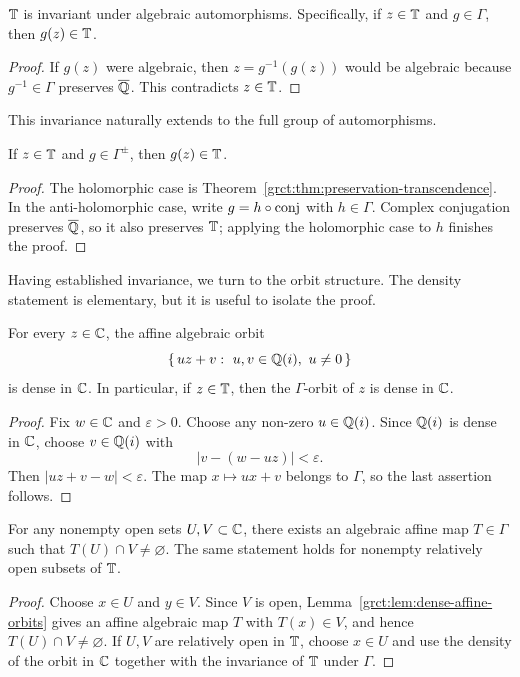 \begin{theorem}\label{grct:thm:preservation-transcendence}
	$\mathbb{T}$ is invariant under algebraic automorphisms. Specifically, if $z\in \mathbb{T}$ and $g\in\Gamma$, then $g(z) \in \mathbb{T}$.
\end{theorem}
\begin{proof}
	If $g(z)$ were algebraic, then $z=g^{-1}(g(z))$ would be algebraic because $g^{-1}\in\Gamma$ preserves $\overline{\mathbb{Q}}$. This contradicts $z\in\mathbb{T}$.
\end{proof}

This invariance naturally extends to the full group of automorphisms.

\begin{theorem}\label{grct:thm:preservation-transcendence-anti}
	If $z\in \mathbb{T}$ and $g\in\Gamma^{\pm}$, then $g(z) \in \mathbb{T}$.
\end{theorem}
\begin{proof}
	The holomorphic case is Theorem~\ref{grct:thm:preservation-transcendence}. In the anti-holomorphic case, write $g=h\circ\mathrm{conj}$ with $h\in\Gamma$. Complex conjugation preserves $\overline{\mathbb{Q}}$, so it also preserves $\mathbb{T}$; applying the holomorphic case to $h$ finishes the proof.
\end{proof}

Having established invariance, we turn to the orbit structure. The density statement is elementary, but it is useful to isolate the proof.

\begin{lemma}\label{grct:lem:dense-affine-orbits}
	For every $z\in\mathbb{C}$, the affine algebraic orbit
	\[
		\{\,uz+v:\ u,v\in\mathbb{Q}(i),\ u\ne0\,\}
	\]
	is dense in $\mathbb{C}$. In particular, if $z\in\mathbb{T}$, then the $\Gamma$-orbit of $z$ is dense in $\mathbb{C}$.
\end{lemma}
\begin{proof}
	Fix $w\in\mathbb{C}$ and $\varepsilon>0$. Choose any non-zero $u\in\mathbb{Q}(i)$. Since $\mathbb{Q}(i)$ is dense in $\mathbb{C}$, choose $v\in\mathbb{Q}(i)$ with
	\[
		|v-(w-uz)|<\varepsilon.
	\]
	Then $|uz+v-w|<\varepsilon$. The map $x\mapsto ux+v$ belongs to $\Gamma$, so the last assertion follows.
\end{proof}

\begin{corollary}\label{grct:cor:topological-transitivity}
	For any nonempty open sets $U,V\subset\mathbb{C}$, there exists an algebraic affine map $T\in\Gamma$ such that $T(U)\cap V\ne\varnothing$. The same statement holds for nonempty relatively open subsets of $\mathbb{T}$.
\end{corollary}
\begin{proof}
	Choose $x\in U$ and $y\in V$. Since $V$ is open, Lemma~\ref{grct:lem:dense-affine-orbits} gives an affine algebraic map $T$ with $T(x)\in V$, and hence $T(U)\cap V\ne\varnothing$. If $U,V$ are relatively open in $\mathbb{T}$, choose $x\in U$ and use the density of the orbit in $\mathbb{C}$ together with the invariance of $\mathbb{T}$ under $\Gamma$.
\end{proof}

